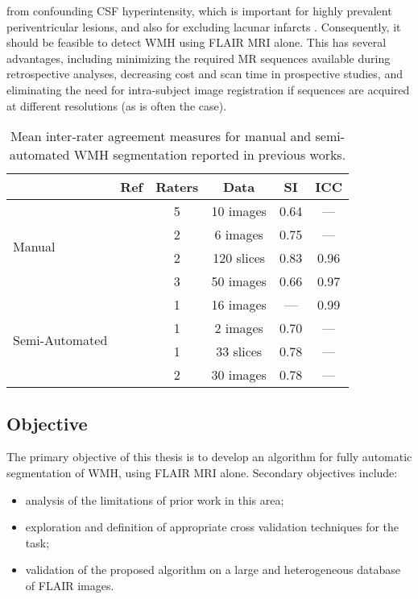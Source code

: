 from confounding CSF hyperintensity, which is important
for highly prevalent periventricular lesions,
and also for excluding lacunar infarcts \cite{Bakshi2001,Barkhof2002}.
Consequently, it should be feasible to detect WMH using FLAIR MRI alone.
This has several advantages, including
minimizing the required MR sequences available during retrospective analyses,
decreasing cost and scan time in prospective studies,
and eliminating the need for intra-subject image registration if
sequences are acquired at different resolutions (as is often the case).
\par
\begin{table}[h]
  \caption{Mean inter-rater agreement measures
    for manual and semi-automated WMH segmentation reported in previous works.}
  \centering
  \begin{tabular}{lccccc}
    \hline
                                    &         Ref          & Raters &    Data    &  SI  & ICC  \\ \hline
    \multirow{4}{*}{Manual}         & \cite{Harmouche2006} &   5    & 10 images  & 0.64 & ---  \\
                                    &  \cite{DeBoer2009b}  &   2    &  6 images  & 0.75 & ---  \\
                                    & \cite{Steenwijk2013} &   2    & 120 slices & 0.83 & 0.96 \\
                                    &   \cite{Egger2017}   &   3    & 50 images  & 0.66 & 0.97 \\ \hline
    \multirow{4}{*}{Semi-Automated} &   \cite{Payne2002}   &   1    & 16 images  & ---  & 0.99 \\
                                    &  \cite{Ghazel2006}   &   1    &  2 images  & 0.70 & ---  \\
                                    &  \cite{Kawata2010}   &   1    & 33 slices  & 0.78 & ---  \\
                                    &   \cite{Iorio2013}   &   2    & 30 images  & 0.78 & ---  \\ \hline
  \end{tabular}
  \label{tab:interrater-cite}
\end{table}
\subsection{Objective}
The primary objective of this thesis is to develop an algorithm
for fully automatic segmentation of WMH, using FLAIR MRI alone.
Secondary objectives include:
\begin{itemize}
  \item analysis of the limitations of prior work in this area;
  \item exploration and definition of appropriate cross validation techniques for the task;
  \item validation of the proposed algorithm on a large and heterogeneous database of FLAIR images.
\end{itemize}
